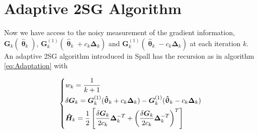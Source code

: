 \documentclass[conference]{IEEEtran}
\newcommand{\bG}{\bm{G}}
\newcommand{\bDelta}{\bm{\Delta}}
\newcommand{\oH}{\bm{\overline{H}}}
\newcommand{\hH}{\bm{\hat{H}}}
\newcommand{\htheta}{\bm{\hat{\uptheta}}}
\newcommand{\tDelta}{\bm{\tilde{\Delta}}}
\newcommand{\remove}[1]{}
\begin{document}
\remove{
We can obtain a rank-2 update from $ \oH_{k-1}^{-1} $ to $ \oH_{k}^{-1} $. The sequential recursion of the $ \oH_k^{-1} $ is as following:
\begin{equation} \label{eq:Enhanced2SPSASequentialUpdate}
\begin{dcases}
	\bm{B}_k^{-1}
	&=\oH_{k-1}^{-1}-\oH_{k-1}^{-1}\tDelta_k^{-1}\\
	&~~~\cdot(b_k^{-1}+\bDelta_k^{-T}\oH_{k-1}^{-1}\tDelta_k^{-1})^{-1}\bDelta_k^{-T}\oH_{k-1}^{-1}\\%
    \oH_k^{-1}
    &=\bm{B}_k^{-1}-\bm{B}_k^{-1}\bDelta_k^{-1}\\
    &~~~\cdot(b_k^{-1}+\tDelta_k^{-T}\bm{B}_k^{-1}\bDelta_k^{-1})^{-1}\tDelta_k^{-T}\bm{B}_k^{-1}
\end{dcases}
\end{equation}
where
\begin{equation} \label{eq:Enhanced2SPSAB}
\bm{B}_k=\oH_{k-1}+b_k\tDelta_k^{-1}\bDelta_k^{-T}
\end{equation}

Now we analyze the FLOPs of the sequential update \ref{eq:Enhanced2SPSASequentialUpdate}, compared with the original algorithm \ref{eq:Enhancement}:
}






\section{Adaptive 2SG Algorithm} \label{2SG}
Now we have access to the noisy measurement of the gradient information, $\bG_k(\htheta_k)$, $\bG_k^{(1)}(\htheta_k+ c_k\bDelta_k)$ and $\bG_k^{(1)}(\htheta_k- c_k\bDelta_k)$ at each iteration $k$. An adaptive 2SG algorithm introduced in Spall \cite{Spall2000} has the recursion as in algorithm \ref{eq:Adaptation} with

\begin{equation} \label{eq:notationSG}
\begin{dcases}
w_k=\frac{1}{k+1}\\
\delta\bG_k=\bG_k^{(1)}(\htheta_k+ c_k\bDelta_k)-\bG_k^{(1)}(\htheta_k- c_k\bDelta_k)\\
\hH_k=\frac{1}{2}\left[ \frac{\delta\bG_k}{2c_k}\bDelta_k^{-T}+\left(\frac{\delta\bG_k}{2c_k}\bDelta_k^{-T}\right)^T \right]\\
\end{dcases}
\end{equation}
\end{document}
